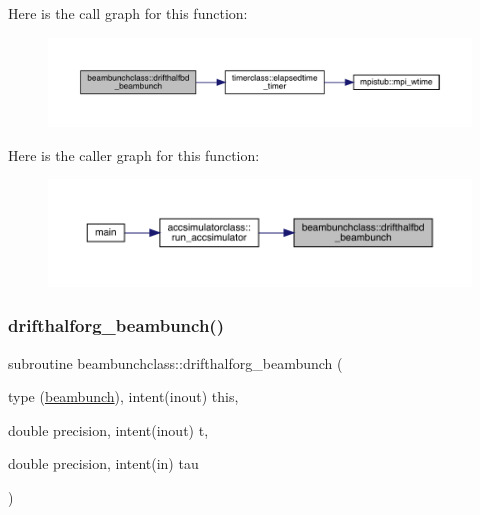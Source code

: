Here is the call graph for this function\+:\nopagebreak
\begin{figure}[H]
\begin{center}
\leavevmode
\includegraphics[width=350pt]{namespacebeambunchclass_a45079536068a233e490ed282b4225c93_cgraph}
\end{center}
\end{figure}
Here is the caller graph for this function\+:\nopagebreak
\begin{figure}[H]
\begin{center}
\leavevmode
\includegraphics[width=350pt]{namespacebeambunchclass_a45079536068a233e490ed282b4225c93_icgraph}
\end{center}
\end{figure}
\mbox{\label{namespacebeambunchclass_a1a12151be16b0be8122e01c579035ddd}} 
\subsubsection{\texorpdfstring{drifthalforg\_beambunch()}{drifthalforg\_beambunch()}}
{\footnotesize\ttfamily subroutine beambunchclass\+::drifthalforg\+\_\+beambunch (\begin{DoxyParamCaption}\item[{type (\mbox{\hyperlink{namespacebeambunchclass_structbeambunchclass_1_1beambunch}{beambunch}}), intent(inout)}]{this,  }\item[{double precision, intent(inout)}]{t,  }\item[{double precision, intent(in)}]{tau }\end{DoxyParamCaption})}



